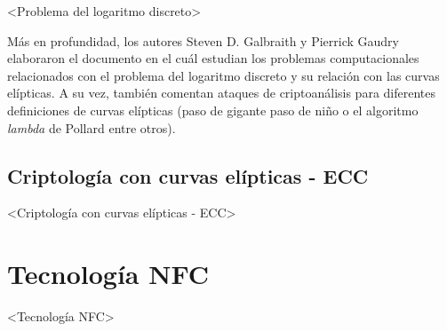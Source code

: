 \documentclass[../PFC.tex]{subfiles}
\begin{document}
<Problema del logaritmo discreto>

Más en profundidad, los autores Steven D. Galbraith y Pierrick Gaudry elaboraron el documento \cite{galbraith2016recent} en el cuál estudian los problemas computacionales relacionados con el problema del logaritmo discreto y su relación con las curvas elípticas. A su vez, también comentan ataques de criptoanálisis para diferentes definiciones de curvas elípticas (paso de gigante paso de niño o el algoritmo \textit{lambda} de Pollard entre otros).

\subsection{Criptología con curvas elípticas - ECC}
\label{Criptología con curvas elípticas - ECC}

<Criptología con curvas elípticas - ECC>

\section{Tecnología NFC}
\label{Tecnología NFC}

<Tecnología NFC>
\end{document}

